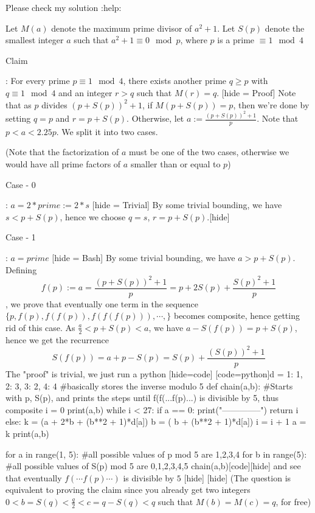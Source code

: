 \begin{solution}
	Please check my solution :help:

Let $M(a)$ denote the maximum prime divisor of $a^2+1$. Let $S(p)$ denote the smallest integer $a$ such that $a^2+1 \equiv 0 \mod p$, where $p$ is a prime $\equiv 1 \mod 4$

\begin{bolded}Claim \end{bolded}: For every prime $p \equiv 1 \mod 4$, there exists another prime $q \geq p$ with $q \equiv 1 \mod 4$ and an integer $r > q$ such that $M(r) = q$.
[hide = Proof] Note that as $p$ divides $(p+S(p))^2+1$, if $M(p+S(p)) = p$, then we're done by setting $q = p$ and $r  = p+S(p)$. Otherwise, let $a := \frac{(p+S(p))^2 + 1}{p}$. Note that $p < a < 2.25p$. We split it into two cases.

(Note that the factorization of $a$ must be one of the two cases, otherwise we would have all prime factors of $a$ smaller than or equal to $p$)
\begin{bolded} Case - 0 \end{bolded}: $a = 2 * prime := 2 * s $
[hide = Trivial] By some trivial bounding, we have $s < p+S(p)$, hence we choose $q= s$, $r = p+S(p)$.[\/hide]
\begin{bolded} Case - 1 \end{bolded}: $a = prime$
[hide = Bash] By some trivial bounding, we have $a > p+S(p)$. Defining $$ f(p) := a = \frac{(p+S(p))^2 + 1}{p} = p + 2S(p) + \frac{S(p)^2 + 1}{p}$$ , we prove that eventually one term in the sequence $\{p, f(p), f(f(p)), f(f(f(p))), \cdots, \}$ becomes composite, hence getting rid of this case. As $ \frac{a}{2} < p+S(p) < a$, we have $a - S(f(p)) = p +  S(p)$, hence we get the recurrence $$S(f(p)) = a+p-S(p) = S(p) + \frac{(S(p))^2 + 1}{p}$$
The "proof" is trivial, we just run a python [hide=code] [code=python]d = {1: 1, 2: 3, 3: 2, 4: 4} #basically stores the inverse modulo 5
def chain(a,b): #Starts with p, S(p), and prints the steps until f(f(...f(p)...) is divisible by 5, thus composite
	i = 0
	print(a,b)
	while i < 27:
		if a == 0:
			print("--------------")
			return i
		else:
			k = (a + 2*b + (b**2 + 1)*d[a]) %
			b = ( b + (b**2 + 1)*d[a]) %
			i = i + 1
			a = k
			print(a,b)

for a in range(1, 5): #all possible values of p mod 5 are 1,2,3,4
	for b in range(5): #all possible values of S(p) mod 5 are 0,1,2,3,4,5
		chain(a,b)[\/code][\/hide] and see that eventually $f(\cdots f(p) \cdots )$ is divisible by $5$ [\/hide] [\/hide]
 (The question is equivalent to proving the claim since you already get two integers $0< b = S(q) < \frac{q}{2} < c = q-S(q) < q$ such that $M(b) = M(c) = q$, for free)
\end{solution}



